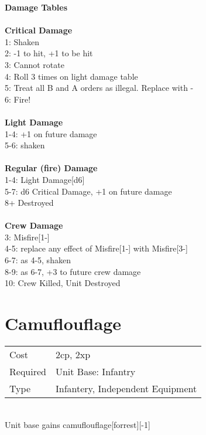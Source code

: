 {\bf Damage Tables} \\
\ \\ {\bf Critical Damage } \\
1: Shaken \\
2: -1 to hit, +1 to be hit \\
3: Cannot rotate \\
4: Roll 3 times on light damage table \\
5: Treat all B and A orders as illegal. Replace with - \\
6: Fire! \\
\ \\ {\bf Light Damage } \\
1-4: +1 on future damage \\
5-6: shaken \\
\ \\ {\bf Regular (fire) Damage } \\
1-4: Light Damage[d6] \\
5-7: d6 Critical Damage, +1 on future damage \\
8+ Destroyed \\
\ \\ {\bf Crew Damage } \\
3: Misfire[1-] \\
4-5: replace any effect of Misfire[1-] with Misfire[3-] \\
6-7: as 4-5, shaken \\
8-9: as 6-7, +3 to future crew damage \\
10: Crew Killed, Unit Destroyed \\









\pagebreak\section{ Camuflouflage }

\begin{tabular}{ll}
    Cost & 2cp, 2xp \\
    Required & Unit Base: Infantry\\
    Type & Infantery, Independent Equipment\\
\end{tabular}
\ \\
Unit base gains camuflouflage[forrest][-1] \\

